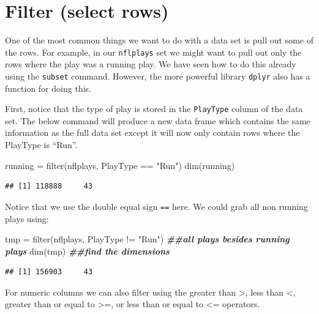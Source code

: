 \documentclass[
]{book}
\newenvironment{Shaded}{\begin{snugshade}}{\end{snugshade}}
\newcommand{\DocumentationTok}[1]{\textcolor[rgb]{0.56,0.35,0.01}{\textbf{\textit{#1}}}}
\newcommand{\FunctionTok}[1]{\textcolor[rgb]{0.00,0.00,0.00}{#1}}
\newcommand{\NormalTok}[1]{#1}
\newcommand{\OtherTok}[1]{\textcolor[rgb]{0.56,0.35,0.01}{#1}}
\newcommand{\SpecialCharTok}[1]{\textcolor[rgb]{0.00,0.00,0.00}{#1}}
\newcommand{\StringTok}[1]{\textcolor[rgb]{0.31,0.60,0.02}{#1}}
\theoremstyle{definition}
\theoremstyle{definition}
\theoremstyle{definition}
\theoremstyle{definition}
\theoremstyle{remark}
\begin{document}
\hypertarget{filter-select-rows}{%
\section{Filter (select rows)}\label{filter-select-rows}}

One of the most common things we want to do with a data set is pull out some of the rows. For example, in our \texttt{nflplays} set we might want to pull out only the rows where the play was a running play. We have seen how to do this already using the \texttt{subset} command. However, the more powerful library \texttt{dplyr} also has a function for doing this.

First, notice that the type of play is stored in the \texttt{PlayType} column of the data set. The below command will produce a new data frame which contains the same information as the full data set except it will now only contain rows where the PlayType is ``Run''.

\begin{Shaded}
\begin{Highlighting}[]
\NormalTok{running }\OtherTok{=} \FunctionTok{filter}\NormalTok{(nflplays, PlayType }\SpecialCharTok{==} \StringTok{"Run"}\NormalTok{)}
\FunctionTok{dim}\NormalTok{(running)}
\end{Highlighting}
\end{Shaded}

\begin{verbatim}
## [1] 118888     43
\end{verbatim}

Notice that we use the double equal sign \texttt{==} here. We could grab all non running plays using:

\begin{Shaded}
\begin{Highlighting}[]
\NormalTok{tmp }\OtherTok{=} \FunctionTok{filter}\NormalTok{(nflplays, PlayType }\SpecialCharTok{!=} \StringTok{"Run"}\NormalTok{)  }\DocumentationTok{\#\#all plays besides running plays}
\FunctionTok{dim}\NormalTok{(tmp)  }\DocumentationTok{\#\#find the dimensions}
\end{Highlighting}
\end{Shaded}

\begin{verbatim}
## [1] 156903     43
\end{verbatim}

For numeric columns we can also filter using the greater than \textgreater, less than \textless, greater than or equal to \textgreater=, or less than or equal to \textless= operators.
\end{document}
